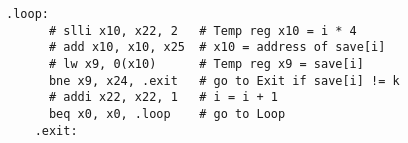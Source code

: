 \documentclass[varwidth]{standalone}
\begin{document}
  \begin{BVerbatim}[gobble=4]
    .loop:
      # slli x10, x22, 2   # Temp reg x10 = i * 4
      # add x10, x10, x25  # x10 = address of save[i]
      # lw x9, 0(x10)      # Temp reg x9 = save[i]
      bne x9, x24, .exit   # go to Exit if save[i] != k
      # addi x22, x22, 1   # i = i + 1
      beq x0, x0, .loop    # go to Loop
    .exit:
  \end{BVerbatim}
\end{document}
